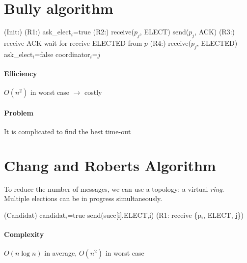\documentclass{article}
\begin{document}
\section{Bully algorithm}

\begin{algorithm}
\Begin(Init:){
}
\Begin(R1:){
	ask\_elect$_i$=true\;
}
\Begin(R2:){
	receive($p_j$, ELECT)\;
	send($p_j$, ACK)\;
}
\Begin(R3:){
	receive ACK\;
	wait for receive ELECTED from $p$\;
}
\Begin(R4:){
	receive($p_j$, ELECTED)\;
	ask\_elect$_i$=false\;
	coordinator$_i$=$j$\;
}
\end{algorithm}

\paragraph{Efficiency}
$O(n^2)$ in worst case $\to$ costly

\paragraph{Problem} It is complicated to find the best time-out

\clearpage



\section{Chang and Roberts Algorithm}
To reduce the number of messages, we can use a topology: a virtual \emph{ring}. Multiple elections can be in progress simultaneously.


\begin{algorithm}
\Begin(Candidat){
	candidat$_{i}$=true\;
	send(succ[i],ELECT,i)\;
}
\Begin(R1: receive \{p$_i$, ELECT, j\}){
}
\end{algorithm}

\paragraph{Complexity}
$O(n\log n)$ in average, $O(n^2)$ in worst case
\end{document}
